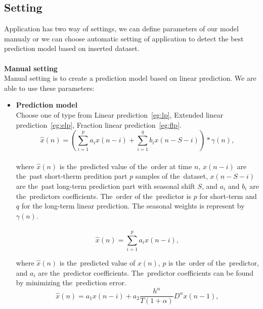         \subsection{Setting}\label{subsec:setting}
        Application has two way of settings, we can define parameters of our model manualy or
        we can choose automatic setting of application to detect the best prediction model
        based on inserted dataset.\\
        \\
        \textbf{Manual setting}\\
        Manual setting is to create a prediction model based on linear prediction. 
        We are able to use these parameters:
        \begin{itemize}
            \item \textbf{Prediction model}\\
            Choose one of type from Linear prediction~\ref{eg:lp}, Extended linear prediction~\ref{eg:elp},
            Fraction linear prediction~\ref{eg:flp}.
            \begin{equation}\label{eg:elp}
                \hat{x}(n) = \left(\sum_{i=1}^{p} a_i x(n-i) + \sum_{i=1}^{q} b_i x(n-S-i)\right) * \gamma(n),
            \end{equation}
            \\
            where $\hat{x}(n)$ is the~predicted value of the~order at time $n$, $x(n-i)$ are the~past short-therm predition part $p$ samples of the~dataset, $x(n-S-i)$ are the~past long-term prediction part with seasonal shift $S$, and $a_i$ and $b_i$ are the~predictors coefficients. The~order of the~predictor is $p$ for short-term and $q$ for the long-term linear prediction. The seasonal weights is represent by $\gamma(n)$.\\
            \\
            \begin{equation}\label{eg:lp}
                \hat{x}(n) = \sum_{i=1}^{p} a_i x(n-i),
                \label{eq:linear-predictor}
            \end{equation}
              
            where $\hat{x}(n)$ is the~predicted value of $x(n)$, $p$ is the~order of the~predictor, and $a_i$ are the~predictor coefficients. The~predictor coefficients can be found by minimizing the~prediction error.
            \\
            \begin{equation}\label{eg:flp}
                \hat{x}(n) = a_1 x(n-i) + a_2 \frac{h^\alpha}{T(1 + \alpha)}D^\alpha x(n-1),
                \label{eq:linear-predictor}
            \end{equation}
            

\end{itemize}
